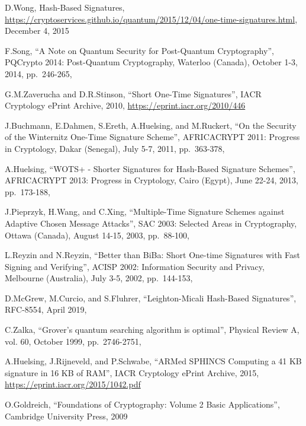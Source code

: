 \documentclass[a4paper,12pt]{article}
\def\rfc#1{RFC-#1\xspace}%
\begin{document}
\begin{thebibliography}{99}
D.Wong,
Hash-Based Signatures,
\url{https://cryptoservices.github.io/quantum/2015/12/04/one-time-signatures.html},
December 4, 2015

F.Song,
``A Note on Quantum Security for Post-Quantum Cryptography'',
PQCrypto 2014: Post-Quantum Cryptography,
Waterloo (Canada),
October 1-3, 2014,
pp.~246-265,

G.M.Zaverucha and D.R.Stinson,
``Short One-Time Signatures'',
IACR Cryptology ePrint Archive,
2010,
\url{https://eprint.iacr.org/2010/446}

J.Buchmann, E.Dahmen, S.Ereth, A.Huelsing, and M.Ruckert,
``On the Security of the Winternitz One-Time Signature Scheme'',
AFRICACRYPT 2011: Progress in Cryptology,
Dakar (Senegal),
July 5-7, 2011,
pp.~363-378,

A.Huelsing,
``WOTS+ - Shorter Signatures for Hash-Based Signature Schemes'',
AFRICACRYPT 2013: Progress in Cryptology,
Cairo (Egypt),
June 22-24, 2013,
pp.~173-188,

J.Pieprzyk, H.Wang, and C.Xing,
``Multiple-Time Signature Schemes against Adaptive Chosen Message Attacks'',
SAC 2003: Selected Areas in Cryptography,
Ottawa (Canada),
August 14-15, 2003,
pp.~88-100,

L.Reyzin and N.Reyzin,
``Better than BiBa: Short One-time Signatures with Fast Signing and Verifying'',
ACISP 2002: Information Security and Privacy,
Melbourne (Australia),
July 3-5, 2002,
pp.~144-153,

D.McGrew, M.Curcio, and S.Fluhrer,
``Leighton-Micali Hash-Based Signatures'',
\rfc{8554},
April 2019,

C.Zalka,
``Grover's quantum searching algorithm is optimal'',
Physical Review A,
vol. 60,
October 1999,
pp.~2746-2751,

A.Huelsing, J.Rijneveld, and P.Schwabe,
``ARMed SPHINCS Computing a 41 KB signature in 16 KB of RAM'',
IACR Cryptology ePrint Archive,
2015,
\url{https://eprint.iacr.org/2015/1042.pdf}

O.Goldreich,
``Foundations of Cryptography: Volume 2 Basic Applications'',
Cambridge University Press,
2009


\end{thebibliography}
\end{document}
